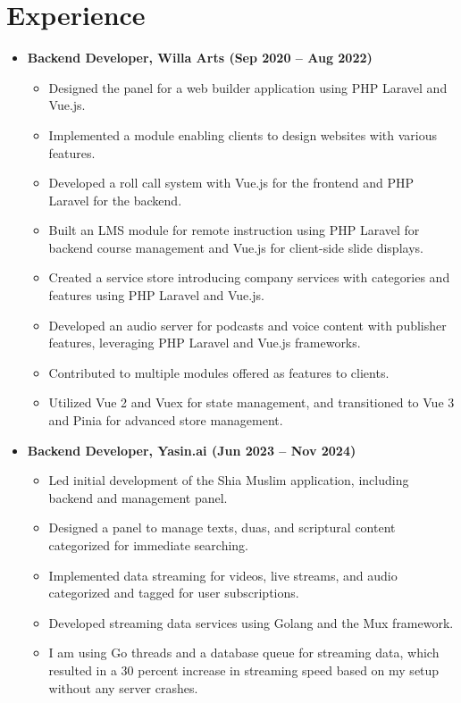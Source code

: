 \documentclass[10pt, letterpaper]{article}
\begin{document}
\section{Experience}
\begin{itemize}[leftmargin=*]
    \item \textbf{Backend Developer, Willa Arts (Sep 2020 -- Aug 2022)}
    \begin{itemize}[leftmargin=1em]
        \item Designed the panel for a web builder application using PHP Laravel and Vue.js.
        \item Implemented a module enabling clients to design websites with various features.
        \item Developed a roll call system with Vue.js for the frontend and PHP Laravel for the backend.
        \item Built an LMS module for remote instruction using PHP Laravel for backend course management and Vue.js for client-side slide displays.
        \item Created a service store introducing company services with categories and features using PHP Laravel and Vue.js.
        \item Developed an audio server for podcasts and voice content with publisher features, leveraging PHP Laravel and Vue.js frameworks.
        \item Contributed to multiple modules offered as features to clients.
        \item Utilized Vue 2 and Vuex for state management, and transitioned to Vue 3 and Pinia for advanced store management.
    \end{itemize}
    \item \textbf{Backend Developer, Yasin.ai (Jun 2023 -- Nov 2024)}
    \begin{itemize}[leftmargin=1em]
        \item Led initial development of the Shia Muslim application, including backend and management panel.
        \item Designed a panel to manage texts, duas, and scriptural content categorized for immediate searching.
        \item Implemented data streaming for videos, live streams, and audio categorized and tagged for user subscriptions.
        \item Developed streaming data services using Golang and the Mux framework.
        \item I am using Go threads and a database queue for streaming data, which resulted in a 30 percent increase in streaming speed based on my setup without any server crashes.

\end{itemize}
\end{itemize}
\end{document}
